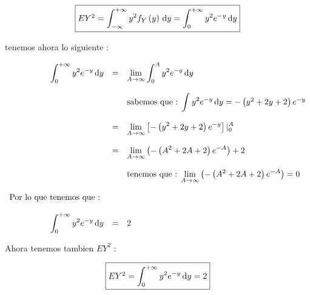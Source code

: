 \documentclass[12pt]{article}
\begin{document}
    \begin{equation*}
        \fbox{$
            EY^2 = \displaystyle \int_{-\infty}^{+\infty}  y^2 f_{Y}\left(y\right) \,\mathrm{d}y  = \displaystyle \int_{0}^{+\infty}  y^2 e^{-y} \,\mathrm{d}y
        $}
    \end{equation*}

    \begin{flushleft}
        tenemos ahora lo siguiente : 
    \end{flushleft}

    \begin{equation*}
        \begin{array}{rcl}
            \displaystyle \int_{0}^{+\infty}  y^2 e^{-y} \,\mathrm{d}y & = &\displaystyle \lim_{A \to \infty} \displaystyle \int_{0}^{A}  y^2 e^{-y} \,\mathrm{d}y
            \\
            \\
            && \mbox{sabemos que : $\displaystyle \int_{}^{}  y^2 e^{-y} \,\mathrm{d}y$}  =  - \left(y^2 + 2y + 2 \right) e^{-y}
            \\
            \\
            & = & \displaystyle \lim_{A \to \infty} \left[ - \left(y^2 + 2y + 2 \right) e^{-y}\right] \vert_{0}^{A}
            \\
            \\
            & = &  \displaystyle \lim_{A \to \infty} \left( - \left(A^2 + 2A + 2 \right) e^{-A}\right) + 2 
            \\
            \\
            && \mbox{tenemos que : $ \displaystyle \lim_{A \to \infty} \left( - \left(A^2 + 2A + 2 \right) e^{-A}\right) = 0 $} 
            \\
            \\
            \mbox{Por lo que tenemos que : }&&
            \\
            \\
            \displaystyle \int_{0}^{+\infty}  y^2 e^{-y} \,\mathrm{d}y & = & 2
        \end{array}
    \end{equation*}

    \begin{flushleft}
        Ahora tenemos tambien $EY^2$ :
    \end{flushleft}

    \begin{equation*}
        \fbox{$
            EY^2 = \displaystyle \int_{0}^{+\infty}  y^2 e^{-y} \,\mathrm{d}y  =  2
        $}
    \end{equation*}
\end{document}
